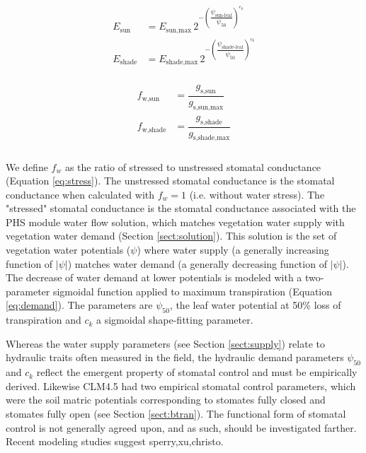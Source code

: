 \documentclass[draft,linenumbers]{agujournal}
\begin{document}
     \begin{linenomath*}
     \begin{eqnarray}
     \begin{aligned}
     \label{eq:demand}
     E_{\text{sun}}     &= E_{\text{sun,max}} \, 2^{-\left(\dfrac{\psi_{\text{sun-leaf}}}{\psi_{50}}\right)^{c_k}} \\
     E_{\text{shade}} &= E_{\text{shade,max}} \, 2^{-\left(\dfrac{\psi_{\text{shade-leaf}}}{\psi_{50}}\right)^{c_k}}
     \end{aligned}
     \end{eqnarray}
     \end{linenomath*}
    
    
     \begin{linenomath*}
     \begin{eqnarray}
     \begin{aligned}
     \label{eq:stress}
     f_{\text{w,sun}}         &= \dfrac{g_{\text{s,sun}}}{g_{\text{s,sun,max}}} \\
     f_{\text{w,shade}}     &= \dfrac{g_{\text{s,shade}}}{g_{\text{s,shade,max}}} \\
     \end{aligned}
     \end{eqnarray}
     \end{linenomath*}
    

     
    We define $f_w$ as the ratio of stressed to unstressed stomatal conductance (Equation \ref{eq:stress}).
    The unstressed stomatal conductance is the stomatal conductance when calculated with $f_w=1$
    (i.e. without water stress). 
    The "stressed" stomatal conductance is the stomatal conductance associated with the PHS module
    water flow solution, which matches vegetation water supply with vegetation water demand 
    (Section \ref{sect:solution}).
    This solution is the set of vegetation water potentials ($\psi$) where water supply
    (a generally increasing function of $\left|\psi\right|$) matches water demand
    (a generally decreasing function of $\left|\psi\right|$).
    The decrease of water demand at lower potentials is modeled with a two-parameter sigmoidal function 
     applied to maximum transpiration (Equation \ref{eq:demand}). 
     The parameters are $\psi_{50}$, the leaf water potential at 50\% loss of transpiration and 
     $c_k$ a sigmoidal shape-fitting parameter.
     
     Whereas the water supply parameters (see Section \ref{sect:supply}) 
     relate to hydraulic traits often measured in the field, 
     the hydraulic demand parameters $\psi_{50}$ and $c_k$ reflect the emergent property of stomatal control
     and must be empirically derived. 
     Likewise CLM4.5 had two empirical stomatal control parameters, which were the soil matric potentials 
     corresponding to stomates fully closed and stomates fully open (see Section \ref{sect:btran}).
     The functional form of stomatal control is not generally agreed upon, and as such, 
     should be investigated farther. Recent modeling studies suggest sperry,xu,christo.
\end{document}

